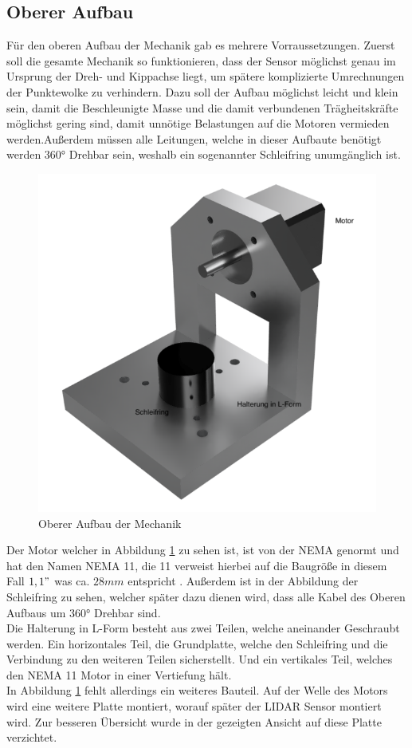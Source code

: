 \subsection{Oberer Aufbau}
Für den oberen Aufbau der Mechanik gab es mehrere Vorraussetzungen. Zuerst soll die gesamte Mechanik so funktionieren, dass der Sensor möglichst genau im Ursprung der Dreh- und Kippachse liegt, um spätere komplizierte Umrechnungen der Punktewolke zu verhindern. Dazu soll der Aufbau möglichst leicht und klein sein, damit die Beschleunigte Masse und die damit verbundenen Trägheitskräfte möglichst gering sind, damit unnötige Belastungen auf die Motoren vermieden werden.Außerdem müssen alle Leitungen, welche in dieser Aufbaute benötigt werden 360° Drehbar sein, weshalb ein sogenannter Schleifring unumgänglich ist. 
\begin{figure}[H]
	\centering
	\includegraphics[width=\textwidth]{images/Mechanik/ObererAufbau}
	\caption{Oberer Aufbau der Mechanik}
	\label{obereraufbau}
\end{figure}
Der Motor welcher in Abbildung \ref{obereraufbau} zu sehen ist, ist von der \ac{NEMA} genormt und hat den Namen \ac{NEMA} 11, die 11 verweist hierbei auf die Baugröße in diesem Fall $1,1"$ was ca. $28mm$ entspricht \cite{NEMA}. Außerdem ist in der Abbildung der Schleifring zu sehen, welcher später dazu dienen wird, dass alle Kabel des Oberen Aufbaus um 360° Drehbar sind. \\
Die Halterung in L-Form besteht aus zwei Teilen, welche aneinander Geschraubt werden. Ein horizontales Teil, die Grundplatte, welche den Schleifring und die Verbindung zu den weiteren Teilen sicherstellt. Und ein vertikales Teil, welches den \ac{NEMA} 11 Motor in einer Vertiefung hält.\\
In Abbildung \ref{obereraufbau} fehlt allerdings ein weiteres Bauteil. Auf der Welle des Motors wird eine weitere Platte montiert, worauf später der \ac{LIDAR} Sensor montiert wird. Zur besseren Übersicht wurde in der gezeigten Ansicht auf diese Platte verzichtet.
